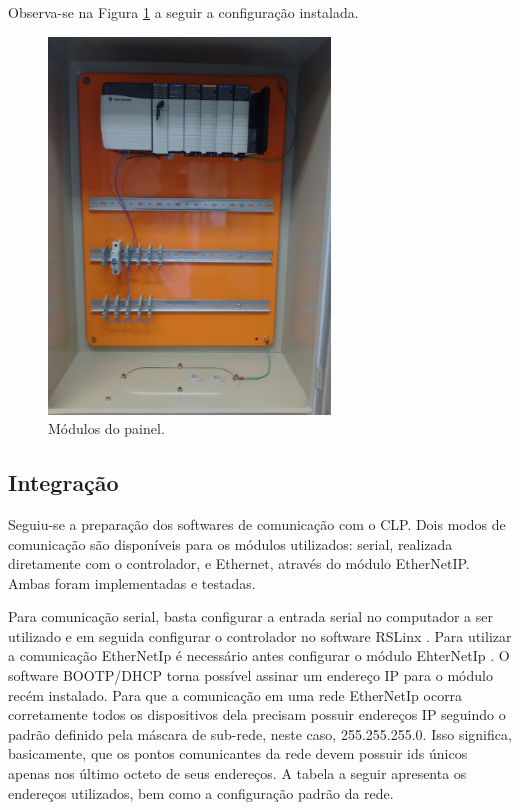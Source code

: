 Observa-se na Figura \ref{fig:modulos} a seguir a configuração instalada.

\begin{figure}[H]
	\centering
	\includegraphics[height=10cm,keepaspectratio]{figs/modulos.jpg}
	\caption{Módulos do painel.}
	\label{fig:modulos}
\end{figure}

\subsection{Integração}
Seguiu-se a preparação dos softwares de comunicação com o CLP. Dois modos de comunicação são disponíveis para os módulos utilizados: serial, realizada diretamente com o controlador, e Ethernet, através do módulo EtherNetIP. Ambas foram implementadas e testadas.

Para comunicação serial, basta configurar a entrada serial no computador a ser utilizado e em seguida configurar o controlador no software RSLinx \cite{rslinx}. Para utilizar a comunicação EtherNetIp é necessário antes configurar o módulo EhterNetIp \cite{ethernetmodule}. O software BOOTP/DHCP torna possível assinar um endereço IP para o módulo recém instalado. Para que a comunicação em uma rede EtherNetIp ocorra corretamente todos os dispositivos dela precisam possuir endereços IP seguindo o padrão definido pela máscara de sub-rede, neste caso, 255.255.255.0. Isso significa, basicamente, que os pontos comunicantes da rede devem possuir ids únicos apenas nos último octeto de seus endereços. A tabela a seguir apresenta os endereços utilizados, bem como a configuração padrão da rede.


